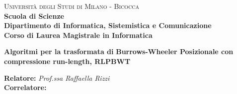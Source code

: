 \documentclass[a4paper,12pt, oneside]{book}
\begin{document}
{} 
\begin{titlepage}
  

  \noindent
  \begin{minipage}[t]{0.19\textwidth}
  \end{minipage}
  \begin{minipage}[t]{0.81\textwidth}
    {
      {\textsc{Università degli Studi di Milano - Bicocca}} \\
      \textbf{Scuola di Scienze} \\
      \textbf{Dipartimento di Informatica, Sistemistica e Comunicazione} \\
      \textbf{Corso di Laurea Magistrale in Informatica} \\
      \par
    }
  \end{minipage}
  
  \vspace{40mm}
  
  \begin{center}
    {\LARGE{
        \textbf{Algoritmi per la trasformata di}}}
    \vspace{1mm}
    {\LARGE{
        \textbf{Burrows-Wheeler Posizionale con}}}
    \vspace{1mm}
    {\LARGE{
        \textbf{compressione run-length, RLPBWT}}}
    
  \end{center}
  
  \vspace{48mm}

  \noindent
  {\large \textbf{Relatore:} \textit{Prof.ssa Raffaella Rizzi}} \\

  \noindent
  {\large \textbf{Correlatore:} \textit{}}
  

\end{titlepage}
\end{document}
